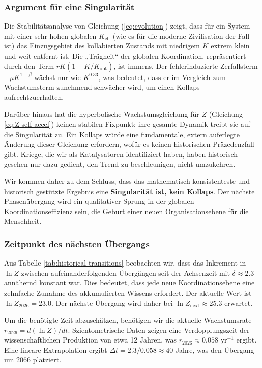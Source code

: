 \documentclass[12pt,a4paper]{article}
\theoremstyle{remark}
\begin{document}
	\subsubsection{Argument für eine Singularität}
	
	Die Stabilitätsanalyse von Gleichung (\ref{eq:evolution}) zeigt, dass für ein System mit einer sehr hohen globalen $K_{\text{eff}}$ (wie es für die moderne Zivilisation der Fall ist) das Einzugsgebiet des kollabierten Zustands mit niedrigem $K$ extrem klein und weit entfernt ist. Die „Trägheit“ der globalen Koordination, repräsentiert durch den Term $rK(1-K/K_{\text{opt}})$, ist immens. Der fehlerinduzierte Zerfallsterm $-\mu K^{1-\beta}$ wächst nur wie $K^{0.33}$, was bedeutet, dass er im Vergleich zum Wachstumsterm zunehmend schwächer wird, um einen Kollaps aufrechtzuerhalten.
	
	Darüber hinaus hat die hyperbolische Wachstumsgleichung für $Z$ (Gleichung \ref{eq:Z-self-accel}) keinen stabilen Fixpunkt; ihre gesamte Dynamik treibt sie auf die Singularität zu. Ein Kollaps würde eine fundamentale, extern auferlegte Änderung dieser Gleichung erfordern, wofür es keinen historischen Präzedenzfall gibt. Kriege, die wir als Katalysatoren identifiziert haben, haben historisch gesehen nur dazu gedient, den Trend zu beschleunigen, nicht umzukehren.
	
	Wir kommen daher zu dem Schluss, dass das mathematisch konsistenteste und historisch gestützte Ergebnis eine \textbf{Singularität ist, kein Kollaps}. Der nächste Phasenübergang wird ein qualitativer Sprung in der globalen Koordinationseffizienz sein, die Geburt einer neuen Organisationsebene für die Menschheit.
	
	\subsubsection{Zeitpunkt des nächsten Übergangs}
	
	Aus Tabelle \ref{tab:historical-transitions} beobachten wir, dass das Inkrement in $\ln Z$ zwischen aufeinanderfolgenden Übergängen seit der Achsenzeit mit $\delta \approx 2.3$ annähernd konstant war. Dies bedeutet, dass jede neue Koordinationsebene eine zehnfache Zunahme des akkumulierten Wissens erfordert. Der aktuelle Wert ist $\ln Z_{2026} = 23.0$. Der nächste Übergang wird daher bei $\ln Z_{\text{next}} \approx 25.3$ erwartet.
	
	Um die benötigte Zeit abzuschätzen, benötigen wir die aktuelle Wachstumsrate $r_{2026} = d(\ln Z)/dt$. Szientometrische Daten \cite{Bornmann2015} zeigen eine Verdopplungszeit der wissenschaftlichen Produktion von etwa 12 Jahren, was $r_{2026} \approx 0.058$ yr$^{-1}$ ergibt. Eine lineare Extrapolation ergibt $\Delta t = 2.3 / 0.058 \approx 40$ Jahre, was den Übergang um 2066 platziert.
	
\end{document}
